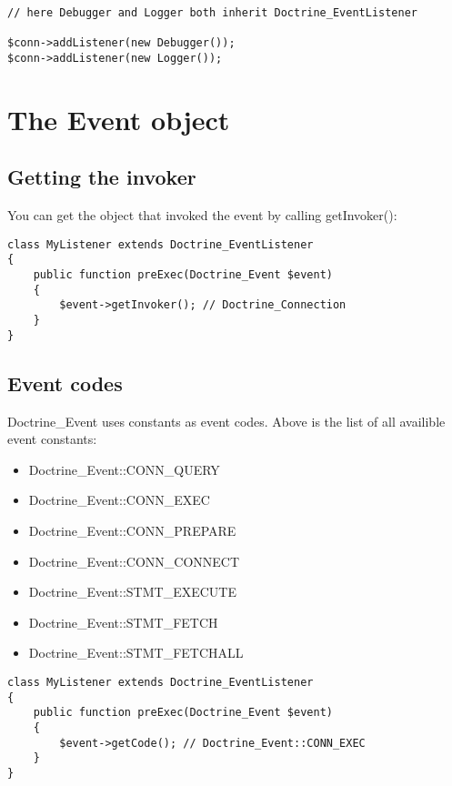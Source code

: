 \documentclass[11pt,a4paper]{report}
\begin{document}
\begin{verbatim}
// here Debugger and Logger both inherit Doctrine_EventListener

$conn->addListener(new Debugger());
$conn->addListener(new Logger());
\end{verbatim}

\section{The Event object}
\subsection{Getting the invoker}
You can get the object that invoked the event by calling getInvoker():

\begin{verbatim}
class MyListener extends Doctrine_EventListener
{
    public function preExec(Doctrine_Event $event)
    {
        $event->getInvoker(); // Doctrine_Connection
    }
}
\end{verbatim}

\subsection{Event codes}
Doctrine\_Event uses constants as event codes. Above is the list of all availible event constants:

\begin{itemize}
\item{Doctrine\_Event::CONN\_QUERY}
\item{Doctrine\_Event::CONN\_EXEC}
\item{Doctrine\_Event::CONN\_PREPARE}
\item{Doctrine\_Event::CONN\_CONNECT}
\item{Doctrine\_Event::STMT\_EXECUTE}
\item{Doctrine\_Event::STMT\_FETCH}
\item{Doctrine\_Event::STMT\_FETCHALL}
\end{itemize}
\begin{verbatim}
class MyListener extends Doctrine_EventListener
{
    public function preExec(Doctrine_Event $event)
    {
        $event->getCode(); // Doctrine_Event::CONN_EXEC
    }
}
\end{verbatim}
\end{document}
